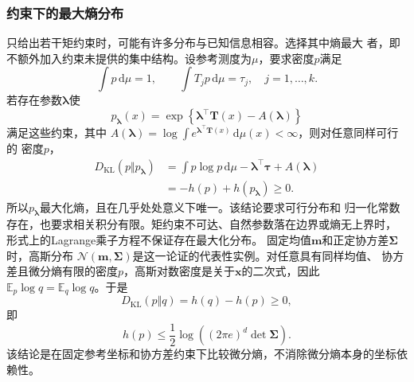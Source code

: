 \subsubsection{约束下的最大熵分布}
只给出若干矩约束时，可能有许多分布与已知信息相容。选择其中熵最大
者，即不额外加入约束未提供的集中结构。设参考测度为\(\mu\)，要求密度\(p\)满足
\[
  \int p\,\mathrm{d}\mu=1,
  \qquad
  \int T_jp\,\mathrm{d}\mu=\tau_j,
  \quad j=1,\ldots,k.
\]
若存在参数\(\bm{\lambda}\)使
\[
  p_{\bm{\lambda}}(x)
  =
  \exp\left\{
    \bm{\lambda}^{\top}\bm{T}(x)
    -A(\bm{\lambda})
  \right\}
\]
满足这些约束，其中
\(A(\bm{\lambda})=\log\int
e^{\bm{\lambda}^{\top}\bm{T}(x)}\,\mathrm{d}\mu(x)<\infty\)，则对任意同样可行的
密度\(p\)，
\[
\begin{aligned}
  D_{\mathrm{KL}}(p\Vert p_{\bm{\lambda}})
  &=
  \int p\log p\,\mathrm{d}\mu
  -\bm{\lambda}^{\top}\bm{\tau}
  +A(\bm{\lambda})\\
  &=
  -h(p)+h(p_{\bm{\lambda}})\geq0.
\end{aligned}
\]
所以\(p_{\bm{\lambda}}\)最大化熵，且在几乎处处意义下唯一。该结论要求可行分布和
归一化常数存在，也要求相关积分有限。矩约束不可达、自然参数落在边界或熵无上界时，
形式上的Lagrange乘子方程不保证存在最大化分布。
固定均值\(\bm{m}\)和正定协方差\(\bm{\Sigma}\)时，高斯分布
\(\mathcal{N}(\bm{m},\bm{\Sigma})\)是这一论证的代表性实例。对任意具有同样均值、
协方差且微分熵有限的密度\(p\)，高斯对数密度是关于\(\bm{x}\)的二次式，因此
\(\mathbb{E}_{p}\log q=\mathbb{E}_{q}\log q\)。于是
\[
  D_{\mathrm{KL}}(p\Vert q)
  =
  h(q)-h(p)\geq0,
\]
即
\[
  h(p)\leq
  \frac12\log\!\left((2\pi e)^d\det\bm{\Sigma}\right).
\]
该结论是在固定参考坐标和协方差约束下比较微分熵，不消除微分熵本身的坐标依赖性。
